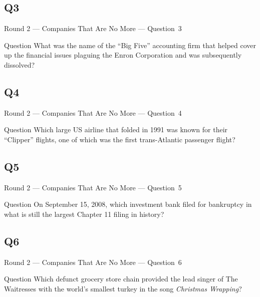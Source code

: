 \documentclass[11pt]{beamer}
\begin{document}
\subsection*{Q3}
\begin{frame}[t]{Round 2 --- Companies That Are No More --- \mbox{Question 3}}
    \vspace{-0.5em}
    \begin{block}{Question}
        What was the name of the ``Big Five'' accounting firm that helped cover up the financial issues plaguing the Enron Corporation and was subsequently dissolved?
    \end{block}
\end{frame}
\subsection*{Q4}
\begin{frame}[t]{Round 2 --- Companies That Are No More --- \mbox{Question 4}}
    \vspace{-0.5em}
    \begin{block}{Question}
        Which large US airline that folded in 1991 was known for their ``Clipper'' flights, one of which was the first trans-Atlantic passenger flight?
    \end{block}
\end{frame}
\subsection*{Q5}
\begin{frame}[t]{Round 2 --- Companies That Are No More --- \mbox{Question 5}}
    \vspace{-0.5em}
    \begin{block}{Question}
        On September 15, 2008, which investment bank filed for bankruptcy in what is still the largest Chapter 11 filing in history?
    \end{block}
\end{frame}
\subsection*{Q6}
\begin{frame}[t]{Round 2 --- Companies That Are No More --- \mbox{Question 6}}
    \vspace{-0.5em}
    \begin{block}{Question}
        Which defunct grocery store chain provided the lead singer of The Waitresses with the world's smallest turkey in the song \emph{Christmas Wrapping}?
    \end{block}
\end{frame}
\end{document}
